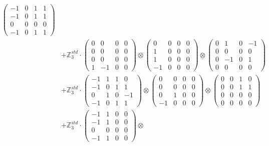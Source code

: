 \documentclass{article}
\begin{document}
{\begin{align}
            \begin{pmatrix} -1 & 0 & 1 & 1 \\ -1 & 0 & 1 & 1 \\ 0 & 0 & 0 & 0 \\ -1 & 0 & 1 & 1 \end{pmatrix} \\ 
        &+ \label{Rs16-Rc11-Solution-6-c25} \mathbb{Z}_3^{std} \cdot 
            \begin{pmatrix} 0 & 0 & 0 & 0 \\ 0 & 0 & 0 & 0 \\ 0 & 0 & 0 & 0 \\ 1 & -1 & 0 & 0 \end{pmatrix} \otimes 
            \begin{pmatrix} 0 & 0 & 0 & 0 \\ 1 & 0 & 0 & 0 \\ 1 & 0 & 0 & 0 \\ -1 & 0 & 0 & 0 \end{pmatrix} \otimes 
            \begin{pmatrix} 0 & 1 & 0 & -1 \\ 0 & 0 & 0 & 0 \\ 0 & -1 & 0 & 1 \\ 0 & 0 & 0 & 0 \end{pmatrix} \\ 
        &+ \label{Rs16-Rc11-Solution-6-c26} \mathbb{Z}_3^{std} \cdot 
            \begin{pmatrix} -1 & 1 & 1 & 0 \\ -1 & 0 & 1 & 1 \\ 0 & 1 & 0 & -1 \\ -1 & 0 & 1 & 1 \end{pmatrix} \otimes 
            \begin{pmatrix} 0 & 0 & 0 & 0 \\ 0 & 0 & 0 & 0 \\ 0 & 1 & 0 & 0 \\ -1 & 0 & 0 & 0 \end{pmatrix} \otimes 
            \begin{pmatrix} 0 & 0 & 1 & 0 \\ 0 & 0 & 1 & 1 \\ 0 & 0 & 0 & 0 \\ 0 & 0 & 0 & 0 \end{pmatrix} \\ 
        &+ \label{Rs16-Rc11-Solution-6-c27} \mathbb{Z}_3^{std} \cdot 
            \begin{pmatrix} -1 & 1 & 0 & 0 \\ -1 & 1 & 0 & 0 \\ 0 & 0 & 0 & 0 \\ -1 & 1 & 0 & 0 \end{pmatrix} \otimes 

\end{align}}
\end{document}
